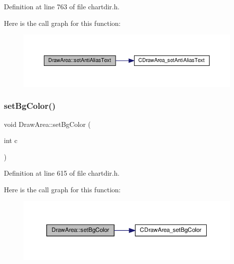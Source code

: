 Definition at line 763 of file chartdir.\+h.

Here is the call graph for this function\+:
\nopagebreak
\begin{figure}[H]
\begin{center}
\leavevmode
\includegraphics[width=350pt]{class_draw_area_a3962cbcc8d0c5964766ea3322ae9b263_cgraph}
\end{center}
\end{figure}
\mbox{\label{class_draw_area_a7371deb8b9b213bfd9e15a78991c37f0}} 
\subsubsection{\texorpdfstring{set\+Bg\+Color()}{setBgColor()}}
{\footnotesize\ttfamily void Draw\+Area\+::set\+Bg\+Color (\begin{DoxyParamCaption}\item[{int}]{c }\end{DoxyParamCaption})\hspace{0.3cm}{\ttfamily [inline]}}



Definition at line 615 of file chartdir.\+h.

Here is the call graph for this function\+:
\nopagebreak
\begin{figure}[H]
\begin{center}
\leavevmode
\includegraphics[width=350pt]{class_draw_area_a7371deb8b9b213bfd9e15a78991c37f0_cgraph}
\end{center}
\end{figure}
\mbox{\label{class_draw_area_a352e5b4cd7cc173079fafe4a62346961}} 
